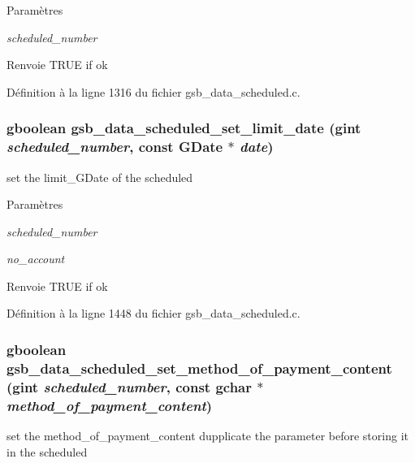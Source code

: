 \begin{DoxyParams}{Paramètres}
\item[{\em scheduled\_\-number}]\item[{\em }]\end{DoxyParams}
\begin{DoxyReturn}{Renvoie}
TRUE if ok 
\end{DoxyReturn}


Définition à la ligne 1316 du fichier gsb\_\-data\_\-scheduled.c.

\subsubsection[{gsb\_\-data\_\-scheduled\_\-set\_\-limit\_\-date}]{\setlength{\rightskip}{0pt plus 5cm}gboolean gsb\_\-data\_\-scheduled\_\-set\_\-limit\_\-date (gint {\em scheduled\_\-number}, \/  const GDate $\ast$ {\em date})}\label{gsb__data__scheduled_8h_a2d738d94b95f2c386c98314393246571}
set the limit\_\-GDate of the scheduled


\begin{DoxyParams}{Paramètres}
\item[{\em scheduled\_\-number}]\item[{\em no\_\-account}]\end{DoxyParams}
\begin{DoxyReturn}{Renvoie}
TRUE if ok 
\end{DoxyReturn}


Définition à la ligne 1448 du fichier gsb\_\-data\_\-scheduled.c.

\subsubsection[{gsb\_\-data\_\-scheduled\_\-set\_\-method\_\-of\_\-payment\_\-content}]{\setlength{\rightskip}{0pt plus 5cm}gboolean gsb\_\-data\_\-scheduled\_\-set\_\-method\_\-of\_\-payment\_\-content (gint {\em scheduled\_\-number}, \/  const gchar $\ast$ {\em method\_\-of\_\-payment\_\-content})}\label{gsb__data__scheduled_8h_a3aff926c0e3cccd2731a1d023e770a34}
set the method\_\-of\_\-payment\_\-content dupplicate the parameter before storing it in the scheduled


